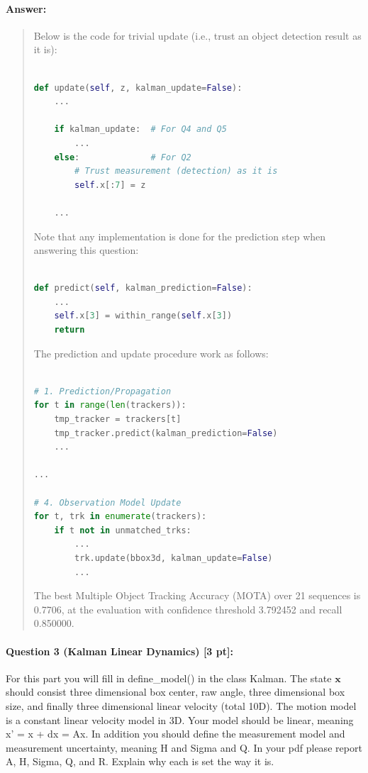 \documentclass[11pt]{article}
\begin{document}
\paragraph{Answer:} 
\begin{quote}

Below is the code for trivial update (i.e., trust an object detection result as it is):

\begin{lstlisting}[language=Python, basicstyle=\scriptsize]

def update(self, z, kalman_update=False):
    ...

    if kalman_update:  # For Q4 and Q5
        ...
    else:              # For Q2
        # Trust measurement (detection) as it is
        self.x[:7] = z

    ...

\end{lstlisting}

Note that any implementation is done for the prediction step when answering this question:

\begin{lstlisting}[language=Python, basicstyle=\scriptsize]

def predict(self, kalman_prediction=False):
    ...
    self.x[3] = within_range(self.x[3])
    return

\end{lstlisting}

The prediction and update procedure work as follows:

\begin{lstlisting}[language=Python, basicstyle=\scriptsize]

# 1. Prediction/Propagation
for t in range(len(trackers)):
    tmp_tracker = trackers[t]
    tmp_tracker.predict(kalman_prediction=False)
    ...

...

# 4. Observation Model Update
for t, trk in enumerate(trackers):
    if t not in unmatched_trks:
        ...
        trk.update(bbox3d, kalman_update=False)
        ...

\end{lstlisting}

The best Multiple Object Tracking Accuracy (MOTA) over 21 sequences is 0.7706, at the evaluation with confidence threshold 3.792452 and recall 0.850000. 

\end{quote}

\paragraph{Question 3 (Kalman Linear Dynamics) [3 pt]:}
For this part you will fill in define\_model() in the class Kalman. The state $\mathbf{x}$ should consist three dimensional box center, raw angle, three dimensional box size, and finally three dimensional linear velocity (total 10D). The motion model is a constant linear velocity model in 3D. Your model should be linear, meaning x' = x + dx = Ax. In addition you should define the measurement model and measurement uncertainty, meaning H and Sigma and Q. In your pdf please report A, H, Sigma, Q, and R. Explain why each is set the way it is.
\end{document}
